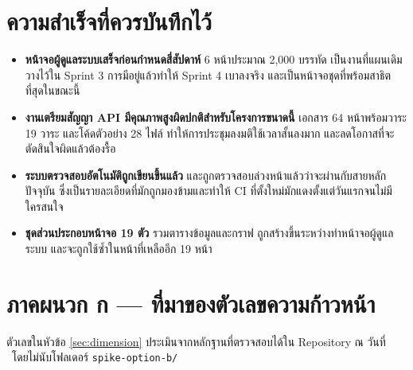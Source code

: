 \section{ความสำเร็จที่ควรบันทึกไว้}

\begin{itemize}
  \item \textbf{หน้าจอผู้ดูแลระบบเสร็จก่อนกำหนดสี่สัปดาห์} 6 หน้าประมาณ 2{,}000 บรรทัด เป็นงานที่แผนเดิมวางไว้ใน Sprint 3 การมีอยู่แล้วทำให้ Sprint 4 เบาลงจริง และเป็นหน้าจอชุดที่พร้อมสาธิตที่สุดในขณะนี้
  \item \textbf{งานเตรียมสัญญา API มีคุณภาพสูงผิดปกติสำหรับโครงการขนาดนี้} เอกสาร 64 หน้าพร้อมวาระ 19 วาระ และโค้ดตัวอย่าง 28 ไฟล์ ทำให้การประชุมลงมติใช้เวลาสั้นลงมาก และลดโอกาสที่จะตัดสินใจผิดแล้วต้องรื้อ
  \item \textbf{ระบบตรวจสอบอัตโนมัติถูกเขียนขึ้นแล้ว} และถูกตรวจสอบล่วงหน้าแล้วว่าจะผ่านกับสายหลักปัจจุบัน ซึ่งเป็นรายละเอียดที่มักถูกมองข้ามและทำให้ CI ที่ตั้งใหม่มักแดงตั้งแต่วันแรกจนไม่มีใครสนใจ
  \item \textbf{ชุดส่วนประกอบหน้าจอ 19 ตัว} รวมตารางข้อมูลและกราฟ ถูกสร้างขึ้นระหว่างทำหน้าจอผู้ดูแลระบบ และจะถูกใช้ซ้ำในหน้าที่เหลืออีก 19 หน้า
\end{itemize}

\clearpage
\section*{ภาคผนวก ก — ที่มาของตัวเลขความก้าวหน้า}

ตัวเลขในหัวข้อ \ref{sec:dimension} ประเมินจากหลักฐานที่ตรวจสอบได้ใน Repository ณ วันที่ \reportdate\ โดยไม่นับโฟลเดอร์ \texttt{spike-option-b/}

